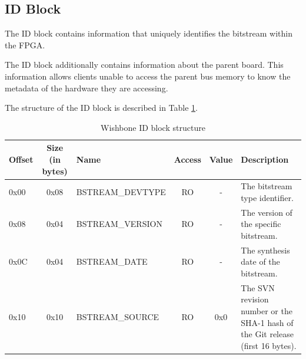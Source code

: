\documentclass{article}
\begin{document}
\subsection{ID Block}\label{id_block}

The ID block contains information that uniquely identifies the bitstream
within the FPGA.

The ID block additionally contains information about the parent board.
This information allows clients unable to access the parent bus memory
to know the metadata of the hardware they are accessing.

The structure of the ID block is described in Table \ref{id_block_struct}.

\begin{center}
	\begin{savenotes}
	\begin{table}[!ht]\footnotesize
	\caption{Wishbone ID block structure}\label{id_block_struct}\centering
	\begin{tabular}{| l | c | l | c | c | p{5cm} |} \hline
	Offset & Size (in bytes) & Name & Access & Value & Description \\ \hline
	0x00 & 0x08 & BSTREAM\_DEVTYPE & RO & - & The bitstream type identifier. \\ \hline
	0x08 & 0x04 & BSTREAM\_VERSION & RO & - & The version of the specific bitstream. \\ \hline
	0x0C & 0x04 & BSTREAM\_DATE & RO & - & The synthesis date of the bitstream. \\ \hline
	0x10 & 0x10 & BSTREAM\_SOURCE & RO & 0x0 & The SVN revision number or the SHA-1 hash of the Git release (first 16 bytes). \\ \hline
	\end{tabular}
	\end{table}
	\end{savenotes}
\end{center}
\end{document}
